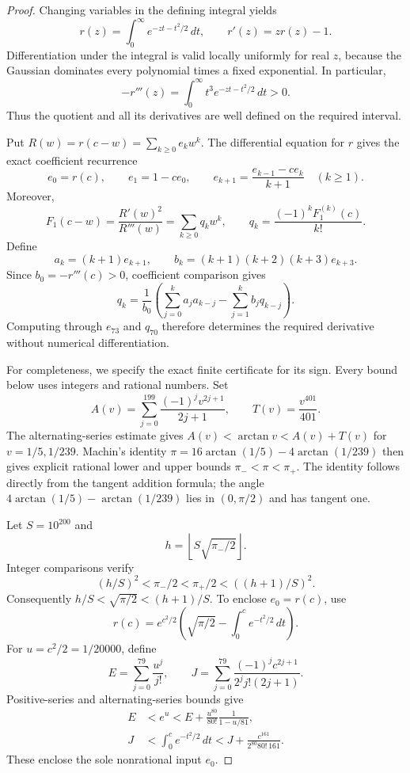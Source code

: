 \documentclass[11pt]{article}
\begin{document}
\begin{proof}
Changing variables in the defining integral yields
\[
 r(z)=\int_0^\infty e^{-zt-t^2/2}\,dt,
 \qquad r'(z)=zr(z)-1.
\]
Differentiation under the integral is valid locally uniformly for real
\(z\), because the Gaussian dominates every polynomial times a fixed
exponential. In particular,
\[
 -r'''(z)=\int_0^\infty t^3e^{-zt-t^2/2}\,dt>0.
\]
Thus the quotient and all its derivatives are well defined on the
required interval.

Put \(R(w)=r(c-w)=\sum_{k\geq0}e_kw^k\). The differential equation
for \(r\) gives the exact coefficient recurrence
\begin{equation}\label{rrec}
 e_0=r(c),\qquad e_1=1-ce_0,\qquad
 e_{k+1}=\frac{e_{k-1}-ce_k}{k+1}\quad(k\geq1).
\end{equation}
Moreover,
\[
 F_1(c-w)=\frac{R'(w)^2}{R'''(w)}=\sum_{k\geq0}q_kw^k,
 \qquad q_k=\frac{(-1)^kF_1^{(k)}(c)}{k!}.
\]
Define
\[
 a_k=(k+1)e_{k+1},\qquad
 b_k=(k+1)(k+2)(k+3)e_{k+3}.
\]
Since \(b_0=-r'''(c)>0\), coefficient comparison gives
\begin{equation}\label{qrec}
 q_k=\frac{1}{b_0}\left(
 \sum_{j=0}^ka_ja_{k-j}-\sum_{j=1}^kb_jq_{k-j}\right).
\end{equation}
Computing through \(e_{73}\) and \(q_{70}\) therefore determines the
required derivative without numerical differentiation.

For completeness, we specify the exact finite certificate for its sign.
Every bound below uses integers and rational numbers. Set
\[
 A(v)=\sum_{j=0}^{199}\frac{(-1)^jv^{2j+1}}{2j+1},
 \qquad T(v)=\frac{v^{401}}{401}.
\]
The alternating-series estimate gives
\(A(v)<\arctan v<A(v)+T(v)\) for \(v=1/5,1/239\).
Machin's identity \(\pi=16\arctan(1/5)-4\arctan(1/239)\) then gives
explicit rational lower and upper bounds \(\pi_-<\pi<\pi_+\).
The identity follows directly from the tangent addition formula;
the angle \(4\arctan(1/5)-\arctan(1/239)\) lies in \((0,\pi/2)\)
and has tangent one.

Let \(S=10^{200}\) and
\[
 h=\left\lfloor S\sqrt{\pi_-/2}\right\rfloor.
\]
Integer comparisons verify
\[
 (h/S)^2<\pi_-/2<\pi_+/2<((h+1)/S)^2.
\]
Consequently \(h/S<\sqrt{\pi/2}<(h+1)/S\).
To enclose \(e_0=r(c)\), use
\[
 r(c)=e^{c^2/2}\left(\sqrt{\pi/2}-\int_0^c e^{-t^2/2}\,dt\right).
\]
For \(u=c^2/2=1/20000\), define
\[
 E=\sum_{j=0}^{79}\frac{u^j}{j!},\qquad
 J=\sum_{j=0}^{79}\frac{(-1)^jc^{2j+1}}{2^jj!(2j+1)}.
\]
Positive-series and alternating-series bounds give
\begin{align*}
 E&<e^u<E+\frac{u^{80}}{80!}\frac1{1-u/81},\\
 J&<\int_0^ce^{-t^2/2}\,dt
   <J+\frac{c^{161}}{2^{80}80!\,161}.
\end{align*}
These enclose the sole nonrational input \(e_0\).


\end{proof}
\end{document}
